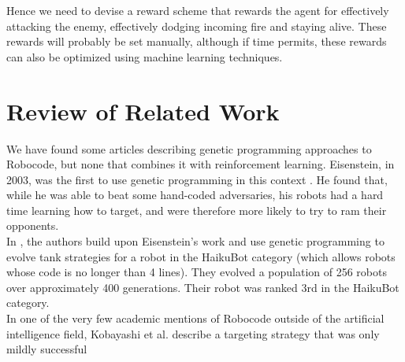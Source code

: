\documentclass{article}
\theoremstyle{plain}
\theoremstyle{definition}
\theoremstyle{remark}
\begin{document}
Hence we need to devise a reward scheme that rewards the agent for effectively attacking the enemy, effectively dodging incoming fire and staying alive. These rewards will probably be set manually, although if time permits, these rewards can also be optimized using machine learning techniques.

\section*{Review of Related Work}
We have found some articles describing genetic programming
approaches to Robocode, but none that combines it with reinforcement
learning. Eisenstein, in 2003, was the first to use genetic programming
in this context \cite{gp2}. He found that,
while he was able to beat some hand-coded adversaries, his robots
had a hard time learning how to target, and were therefore more
likely to try to ram their opponents.\\

In \cite{gp1}, the authors build upon Eisenstein's work and use genetic programming to evolve tank
strategies for a robot in the HaikuBot category (which allows
robots whose code is no longer than 4 lines). They evolved a population
of 256 robots over approximately 400 generations. Their robot was ranked
3rd in the HaikuBot category.\\

In one of the very few academic mentions of Robocode outside of the artificial
intelligence field, Kobayashi et al. describe a targeting strategy that was
only mildly successful \cite{strategies}


\end{document}
